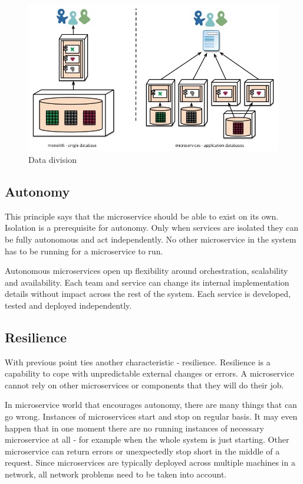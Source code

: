 \documentclass[12pt,oneside]{fithesis2}
\begin{document}
\begin{figure}[ht!]
	\label{decentralised_data}
	\centering
	\includegraphics[width=\textwidth]{images/decentralised_data.png}
	\caption{Data division \cite{mf}}
\end{figure}

\subsection{Autonomy}

This principle says that the microservice should be able to exist on its own. Isolation is a prerequisite for autonomy. Only when services are isolated they can be fully autonomous and act independently. No other microservice in the system has to be running for a microservice to run.

Autonomous microservices open up flexibility around orchestration, scalability and availability. Each team and service can change its internal implementation details without impact across the rest of the system. Each service is developed, tested and deployed independently.

\subsection{Resilience}

With previous point ties another characteristic - resilience. Resilience is a capability to cope with unpredictable external changes or errors. A microservice cannot rely on other microservices or components that they will do their job.

In microservice world that encourages autonomy, there are many things that can go wrong. Instances of microservices start and stop on regular basis. It may even happen that in one moment there are no running instances of necessary microservice at all - for example when the whole system is just starting. Other microservice can return errors or unexpectedly stop short in the middle of a request. Since microservices are typically deployed across multiple machines in a network, all network problems need to be taken into account.
\end{document}

